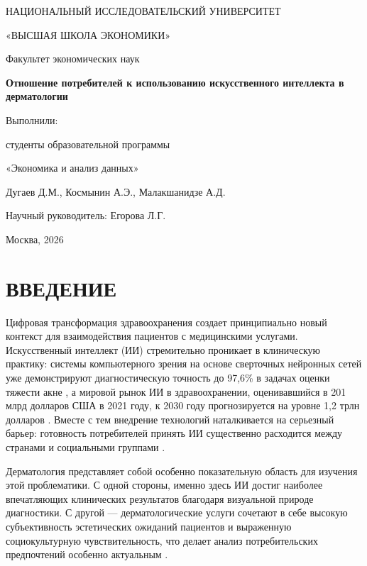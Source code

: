 \documentclass[12pt, a4paper]{article}
\begin{document}
\begin{titlepage}
    \centering
    {\scshape\Large НАЦИОНАЛЬНЫЙ ИССЛЕДОВАТЕЛЬСКИЙ УНИВЕРСИТЕТ \par}
    {\scshape\large «ВЫСШАЯ ШКОЛА ЭКОНОМИКИ» \par}
    \vspace{0.5cm}
    {\large Факультет экономических наук \par}
    \vspace{3cm}
    {\huge\bfseries Отношение потребителей к использованию искусственного интеллекта в дерматологии \par}
    \vspace{3cm}
    {\large Выполнили: \par}
    {\large студенты образовательной программы \par}
    {\large «Экономика и анализ данных» \par}
    {\large Дугаев Д.М., Космынин А.Э., Малакшанидзе А.Д. \par}
    \vfill
    {\large Научный руководитель: Егорова Л.Г. \par}
    \vspace{1cm}
    {\large Москва, 2026 \par}
\end{titlepage}

\tableofcontents
\newpage

\section{ВВЕДЕНИЕ}
\label{sec:intro}

Цифровая трансформация здравоохранения создает принципиально новый контекст для взаимодействия пациентов с медицинскими услугами. Искусственный интеллект (ИИ) стремительно проникает в клиническую практику: системы компьютерного зрения на основе сверточных нейронных сетей уже демонстрируют диагностическую точность до 97,6\% в задачах оценки тяжести акне \cite{Traini2025}, а мировой рынок ИИ в здравоохранении, оценивавшийся в 201 млрд долларов США в 2021 году, к 2030 году прогнозируется на уровне 1,2 трлн долларов \cite{Lamotkin2024}. Вместе с тем внедрение технологий наталкивается на серьезный барьер: готовность потребителей принять ИИ существенно расходится между странами и социальными группами \cite{Jutzi2020, McRae2025}.

Дерматология представляет собой особенно показательную область для изучения этой проблематики. С одной стороны, именно здесь ИИ достиг наиболее впечатляющих клинических результатов благодаря визуальной природе диагностики. С другой — дерматологические услуги сочетают в себе высокую субъективность эстетических ожиданий пациентов и выраженную социокультурную чувствительность, что делает анализ потребительских предпочтений особенно актуальным \cite{Artsrouni2025}.
\end{document}
